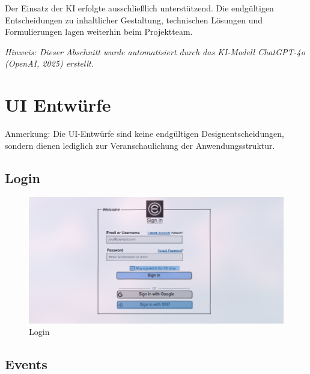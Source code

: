 \documentclass[a4paper,12pt]{article}
\begin{document}
Der Einsatz der KI erfolgte ausschließlich unterstützend. Die endgültigen Entscheidungen zu inhaltlicher Gestaltung, technischen Lösungen und Formulierungen lagen weiterhin beim Projektteam.

\vspace{1em}
\noindent\textit{Hinweis: Dieser Abschnitt wurde automatisiert durch das KI-Modell ChatGPT-4o (OpenAI, 2025) erstellt.}

\newpage

\appendix


\section{UI Entwürfe}
Anmerkung: Die UI-Entwürfe sind keine endgültigen Designentscheidungen, sondern dienen lediglich zur Veranschaulichung der Anwendungsstruktur.

\subsection{Login}
\begin{figure}[H]
    \centering
    \includegraphics[width=1\textwidth]{Abbildungen/events/login.png}
    \caption{Login}
    \label{fig:login}
\end{figure}

\subsection{Events}
\end{document}

